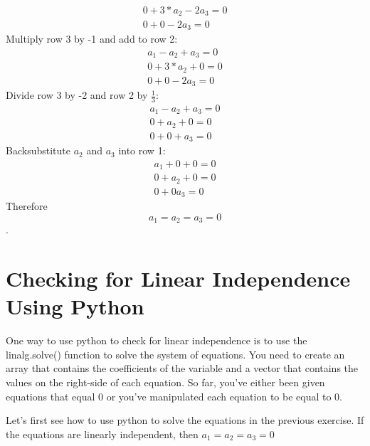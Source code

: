 \begin{Answer}[ref=vector_independence]
$$\begin{matrix}
			0 +   3*a_2 -2a_3    = 0 \\
			0   + 0   - 2a_3 = 0
		  \end{matrix} $$
	Multiply row 3 by -1 and add to row 2:
		$$\begin{matrix}
			a_1 - a_2 + a_3 = 0 \\
			0 +   3*a_2 +0    = 0 \\
			0   + 0   - 2a_3 = 0
		\end{matrix} $$
    Divide row 3 by -2 and row 2 by $\frac{1}{3}$:
    	$$\begin{matrix}
			a_1 - a_2 + a_3 = 0 \\
			0 +   a_2 +0    = 0 \\
			0   + 0  + a_3 = 0
		\end{matrix} $$
	Backsubstitute $a_2$ and $a_3$ into row 1:
	 	$$\begin{matrix}
			a_1 +0 + 0 = 0 \\
			0 +   a_2 +0   = 0 \\
			0   + 0   a_3 = 0
		\end{matrix} $$
	 Therefore $$a_1 = a_2 = a_3 = 0$$.
\end{Answer}
    
\section{Checking for Linear Independence Using Python}  
One way to use python to check for linear independence is to use the linalg.solve() function to solve the system of equations. You need to create an array that contains the coefficients of the variable and a vector that contains the values on the right-side of each equation. So far, you've either been given equations that equal 0 or you've manipulated each equation to be equal to 0. 

Let's first see how to use python to solve the equations in the previous exercise. If the equations are linearly independent, then $a_1 = a_2 = a_3 = 0$

